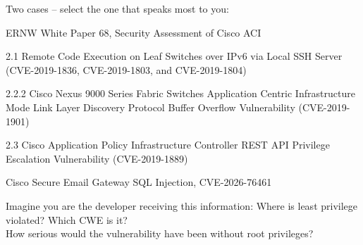 \documentclass[Screen16to9,17pt]{foils}
\begin{document}

Two cases -- select the one that speaks most to you:
\begin{list1}
\item ERNW White Paper 68, Security Assessment of Cisco ACI\\{\footnotesize
{}}
\begin{list2}
\item 2.1 Remote Code Execution on Leaf Switches over IPv6 via Local SSH Server (CVE-2019-1836, CVE-2019-1803, and CVE-2019-1804)
\item 2.2.2 Cisco Nexus 9000 Series Fabric Switches Application Centric Infrastructure Mode Link Layer
Discovery Protocol Buffer Overflow Vulnerability (CVE-2019-1901)
\item 2.3 Cisco Application Policy Infrastructure Controller REST API Privilege Escalation Vulnerability (CVE-2019-1889)
\end{list2}
\item Cisco Secure Email Gateway SQL Injection, CVE-2026-76461\\{\footnotesize
{}}
\end{list1}

Imagine you are the developer receiving this information:
Where is least privilege violated? Which CWE is it? \\
How serious would the vulnerability have been without root privileges?









\end{document}
